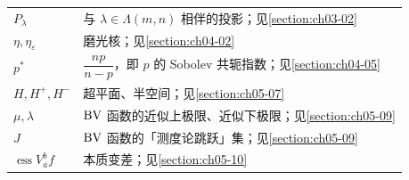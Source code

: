 \documentclass[../../main.tex]{subfiles}%
\begin{document}
\begin{longtable}{@{}p{}p{}@{}}
$P_\lambda$ & 与 $\lambda\in\Lambda(m,n)$ 相伴的投影；见\cref{section:ch03-02} \\%
$\eta,\eta_\varepsilon$ & 磨光核；见\cref{section:ch04-02} \\%
$p^*$ & $\dfrac{np}{n-p}$，即 $p$ 的 Sobolev 共轭指数；见\cref{section:ch04-05} \\%
$H,H^+,H^-$ & 超平面、半空间；见\cref{section:ch05-07} \\%
$\mu,\lambda$ & $\mathrm{BV}$ 函数的近似上极限、近似下极限；见\cref{section:ch05-09} \\%
$J$ & $\mathrm{BV}$ 函数的「测度论跳跃」集；见\cref{section:ch05-09} \\%
$\operatorname{ess}V_a^b f$ & 本质变差；见\cref{section:ch05-10} \\%
\bottomrule
\end{longtable}
\end{document}
